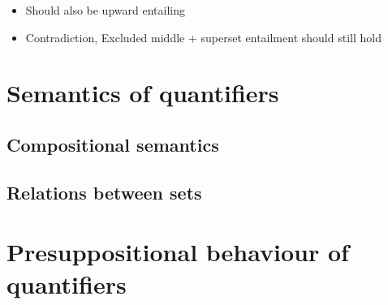 \documentclass[a4paper]{article}
\begin{document}
\begin{itemize}
	\item Should also be upward entailing
	\item Contradiction, Excluded middle + superset entailment should still hold
\end{itemize}


\section{Semantics of quantifiers}

\subsection{Compositional semantics}
\subsection{Relations between sets}


\section{Presuppositional behaviour of quantifiers}
\end{document}
